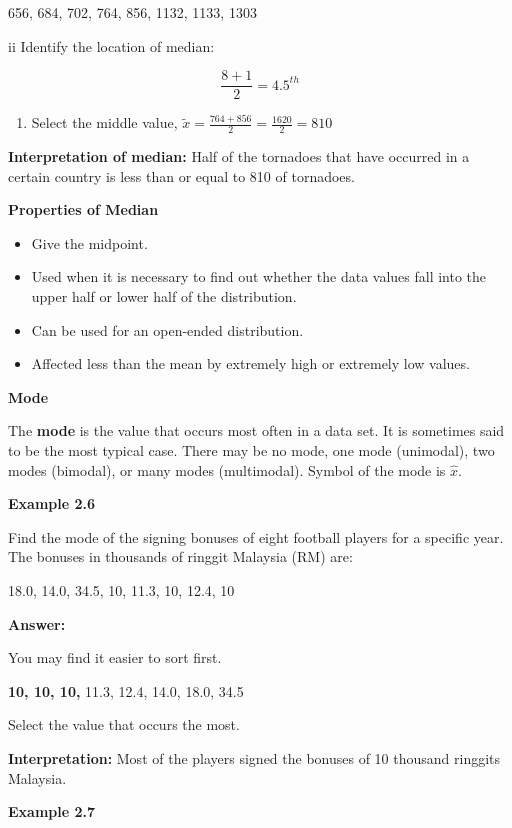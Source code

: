 \documentclass[
  a4paper,
  DIV=11,
  numbers=noendperiod,
  oneside]{scrreprt}
\providecommand{\tightlist}{%
  \setlength{\itemsep}{0pt}\setlength{\parskip}{0pt}}\usepackage{longtable,booktabs,array}
\begin{document}
656, 684, 702, 764, 856, 1132, 1133, 1303

ii Identify the location of median:

\[
\frac{8 + 1}{2} = 4.5^{th}
\]

\begin{enumerate}
\def\labelenumi{\roman{enumi}.}
\setcounter{enumi}{2}
\tightlist
\item
  Select the middle value,
  \(\tilde{x} = \frac{764 + 856}{2} = \frac{1620}{2} = 810\)
\end{enumerate}

\textbf{Interpretation of median:} Half of the tornadoes that have
occurred in a certain country is less than or equal to 810 of tornadoes.

\textbf{Properties of Median}

\begin{itemize}
\tightlist
\item
  Give the midpoint.
\item
  Used when it is necessary to find out whether the data values fall
  into the upper half or lower half of the distribution.
\item
  Can be used for an open-ended distribution.
\item
  Affected less than the mean by extremely high or extremely low values.
\end{itemize}

\textbf{Mode}

The \textbf{mode} is the value that occurs most often in a data set. It
is sometimes said to be the most typical case. There may be no mode, one
mode (unimodal), two modes (bimodal), or many modes (multimodal). Symbol
of the mode is \(\hat{x}\).

{\textbf{Example 2.6}}

Find the mode of the signing bonuses of eight football players for a
specific year. The bonuses in thousands of ringgit Malaysia (RM) are:

18.0, 14.0, 34.5, 10, 11.3, 10, 12.4, 10

{\textbf{Answer:}}

You may find it easier to sort first.

\textbf{10, 10, 10,} 11.3, 12.4, 14.0, 18.0, 34.5

Select the value that occurs the most.

\textbf{Interpretation:} Most of the players signed the bonuses of 10
thousand ringgits Malaysia.

{\textbf{Example 2.7}}
\end{document}
